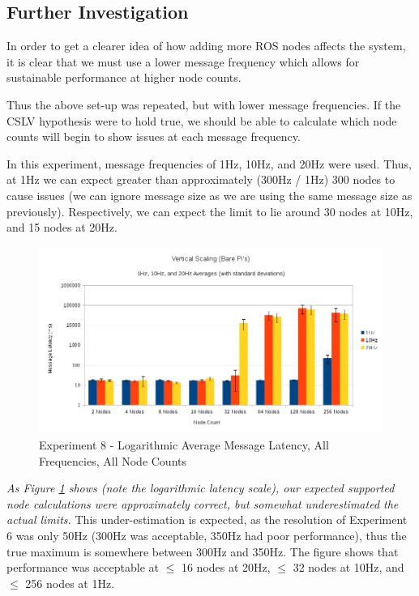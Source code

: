 \documentclass[../dissertation.tex]{subfiles}
\begin{document}
\subsection{Further Investigation}

In order to get a clearer idea of how adding more ROS nodes affects the system, it is clear that we must use a lower message frequency which allows for sustainable performance at higher node counts.

Thus the above set-up was repeated, but with lower message frequencies. If the CSLV hypothesis were to hold true, we should be able to calculate which node counts will begin to show issues at each message frequency.

In this experiment, message frequencies of 1Hz, 10Hz, and 20Hz were used. Thus, at 1Hz we can expect greater than approximately (300Hz / 1Hz) 300 nodes to cause issues (we can ignore message size as we are using the same message size as previously). Respectively, we can expect the limit to lie around 30 nodes at 10Hz, and 15 nodes at 20Hz.

\begin{figure}[H]
\centering
\includegraphics[width=\textwidth]{images/experiment8/vertical_scaling_all_freqs_log_avg_msg_latency.png}
\caption{Experiment 8 - Logarithmic Average Message Latency, All Frequencies, All Node Counts}
\label{exp8-all-freqs-averages}
\end{figure}

\textit{As Figure \ref{exp8-all-freqs-averages} shows (note the logarithmic latency scale), our expected supported node calculations were approximately correct, but somewhat underestimated the actual limits.} This under-estimation is expected, as the resolution of Experiment 6 was only 50Hz (300Hz was acceptable, 350Hz had poor performance), thus the true maximum is somewhere between 300Hz and 350Hz. The figure shows that performance was acceptable at $\leq$ 16 nodes at 20Hz, $\leq$ 32 nodes at 10Hz, and $\leq$ 256 nodes at 1Hz.
\end{document}
